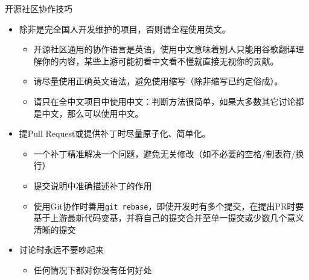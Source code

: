 
\begin{frame}{开源社区协作技巧}
	\begin{itemize}
		\item 除非是完全国人开发维护的项目，否则请全程使用英文。
		\begin{itemize}
		    \item 开源社区通用的协作语言是英语，使用中文意味着别人只能用谷歌翻译理解你的内容，某些上游可能初看中文看不懂就直接无视你的贡献。
		    \item 请尽量使用正确英文语法，避免使用缩写（除非缩写已约定俗成）。
		    \item 请只在全中文项目中使用中文：判断方法很简单，如果大多数其它讨论都是中文，那么可以使用中文。
		\end{itemize}
	    \item 提Pull Request或提供补丁时尽量原子化、简单化。
	    \begin{itemize}
	    	\item 一个补丁精准解决一个问题，避免无关修改（如不必要的空格/制表符/换行）
	    	\item 提交说明中准确描述补丁的作用
	    	\item 使用Git协作时善用\texttt{git rebase}，即使开发时有多个提交，在提出PR时要基于上游最新代码变基，并将自己的提交合并至单一提交或少数几个意义清晰的提交
	    \end{itemize}
        \item 讨论时永远不要吵起来
        \begin{itemize}
        	\item 任何情况下都对你没有任何好处
        \end{itemize}
	\end{itemize}	
\end{frame}

